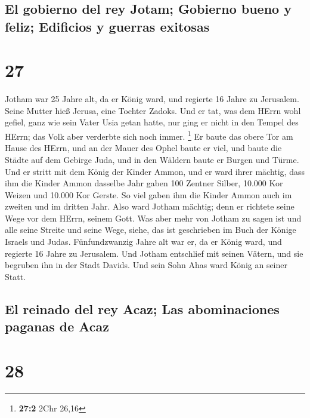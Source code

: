 \hypertarget{el-gobierno-del-rey-jotam-gobierno-bueno-y-feliz-edificios-y-guerras-exitosas}{%
\subsection{El gobierno del rey Jotam; Gobierno bueno y feliz; Edificios
y guerras
exitosas}\label{el-gobierno-del-rey-jotam-gobierno-bueno-y-feliz-edificios-y-guerras-exitosas}}

\hypertarget{section-26}{%
\section{27}\label{section-26}}

 Jotham war 25 Jahre alt, da er König ward, und regierte
16 Jahre zu Jerusalem. Seine Mutter hieß Jerusa, eine Tochter Zadoks.
 Und er tat, was dem HErrn wohl gefiel, ganz wie sein
Vater Usia getan hatte, nur ging er nicht in den Tempel des HErrn; das
Volk aber verderbte sich noch immer. \footnote{\textbf{27:2} 2Chr 26,16}
 Er baute das obere Tor am Hause des HErrn, und an der
Mauer des Ophel baute er viel,  und baute die Städte auf
dem Gebirge Juda, und in den Wäldern baute er Burgen und Türme.
 Und er stritt mit dem König der Kinder Ammon, und er ward
ihrer mächtig, dass ihm die Kinder Ammon dasselbe Jahr gaben 100 Zentner
Silber, 10.000 Kor Weizen und 10.000 Kor Gerste. So viel gaben ihm die
Kinder Ammon auch im zweiten und im dritten Jahr.  Also
ward Jotham mächtig; denn er richtete seine Wege vor dem HErrn, seinem
Gott.  Was aber mehr von Jotham zu sagen ist und alle
seine Streite und seine Wege, siehe, das ist geschrieben im Buch der
Könige Israels und Judas.  Fünfundzwanzig Jahre alt war
er, da er König ward, und regierte 16 Jahre zu Jerusalem. 
Und Jotham entschlief mit seinen Vätern, und sie begruben ihn in der
Stadt Davids. Und sein Sohn Ahas ward König an seiner Statt.

\hypertarget{el-reinado-del-rey-acaz-las-abominaciones-paganas-de-acaz}{%
\subsection{El reinado del rey Acaz; Las abominaciones paganas de
Acaz}\label{el-reinado-del-rey-acaz-las-abominaciones-paganas-de-acaz}}

\hypertarget{section-27}{%
\section{28}\label{section-27}}

